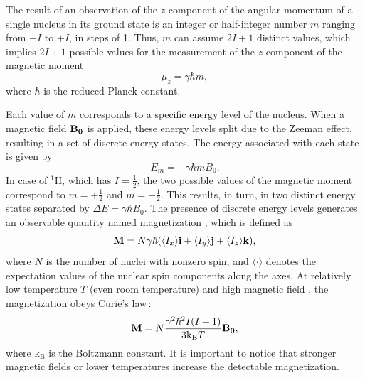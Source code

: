The result of an observation of the $z$-component of the angular momentum  of a single nucleus in its ground state is an integer or half-integer number $m$ ranging from $-I$ to $+I$, in steps of \num{1}. Thus, $m$ can assume $2I + 1$ distinct values, which implies $2I + 1$ possible values for the measurement of the $z$-component of the magnetic moment
\begin{equation}
    \mu_z = \gamma \hbar m,
\end{equation}
where $\hbar$ is the reduced Planck constant.

Each value of $m$ corresponds to a specific energy level of the nucleus. When a magnetic field $\mathbf{B_0}$ is applied, these energy levels split due to the Zeeman effect, resulting in a set of discrete energy states. The energy associated with each state is given by
\begin{equation}
    E_m = -\gamma \hbar m B_0.
\end{equation}
In case of $^1$H, which has $I = \frac{1}{2}$, the two possible values of the magnetic moment correspond to $m = +\frac{1}{2}$ and $m = -\frac{1}{2}$. This results, in turn, in two distinct energy states separated by $\Delta E = \gamma \hbar B_0$. The presence of discrete energy levels generates an observable quantity named magnetization , which is defined as
\begin{equation}
    \mathbf{M} = N \gamma \hbar (\langle I_x \rangle \mathbf{i} + \langle I_y \rangle \mathbf{j} + \langle I_z \rangle \mathbf{k}),
\end{equation}
where $N$ is the number of nuclei with nonzero spin, and $\langle \cdot \rangle$ denotes the expectation values of the nuclear spin components along the axes. At relatively low temperature $T$ (even room temperature) and high magnetic field , the magnetization obeys Curie's law\,\cite{curie_law}:
\begin{equation}
    \mathbf{M} = N\frac{\gamma^2 \hbar^2 I(I+1)}{3\mathrm{k}_\mathrm{B} T} \mathbf{B_0},
\end{equation}
where $\mathrm{k}_\mathrm{B}$ is the Boltzmann constant. It is important to notice that stronger magnetic fields or lower temperatures increase the detectable magnetization.

